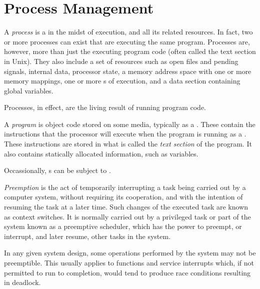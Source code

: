 \section{Process Management}\label{sec:Process_Management}
\begin{definition}[Process]\label{def:Process}
  A \emph{process} is a  in the midst of execution, and all its related resources.
  In fact, two or more processes can exist that are executing the same program.
  Processes are, however, more than just the executing program code (often called the text section in Unix).
  They also include a set of resources such as open files and pending signals, internal  data, processor state, a memory address space with one or more memory mappings, one or more s of execution, and a data section containing global variables.

  Processes, in effect, are the living result of running program code.
\end{definition}

\begin{definition}[Program]\label{def:Program}
  A \emph{program} is object code stored on some media, typically as a .
  These contain the instructions that the processor will execute when the program is running as a .
  These instructions are stored in what is called the \emph{text section} of the program.
  It also contains statically allocated information, such as  variables.
\end{definition}

Occassionally, s can be subject to .

\begin{definition}[Preemption]\label{def:Preemption}
  \emph{Preemption} is the act of temporarily interrupting a task being carried out by a computer system, without requiring its cooperation, and with the intention of resuming the task at a later time.
  Such changes of the executed task are known as context switches.
  It is normally carried out by a privileged task or part of the system known as a preemptive scheduler, which has the power to preempt, or interrupt, and later resume, other tasks in the system.

  In any given system design, some operations performed by the system may not be preemptible.
  This usually applies to  functions and service interrupts which, if not permitted to run to completion, would tend to produce race conditions resulting in deadlock.
\end{definition}

